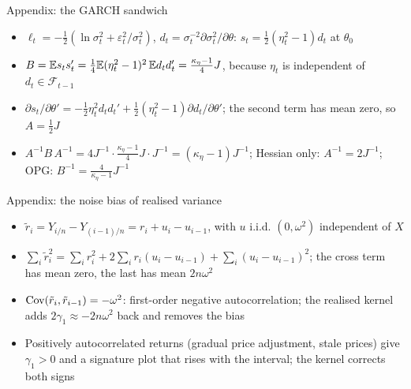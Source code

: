 \begin{frame}{Appendix: the GARCH sandwich}
\hypertarget{atsapp1}{}
\itemsize{\small}
\begin{itemize}
    \item $\ell_t = -\frac12(\ln\sigma^2_t + \varepsilon^2_t/\sigma^2_t)$, $d_t = \sigma_t^{-2}\partial\sigma^2_t/\partial\theta$: $s_t = \frac12(\eta^2_t - 1)d_t$ at $\theta_0$
    \item $B = \mathbb{E} s_ts_t' = \frac14\mathbb{E}(\eta^2_t - 1)^2\,\mathbb{E} d_td_t' = \frac{\kappa_\eta - 1}{4}J$, because $\eta_t$ is independent of $d_t \in \mathcal F_{t-1}$
    \item $\partial s_t/\partial\theta' = -\frac12\eta^2_td_td_t' + \frac12(\eta^2_t - 1)\partial d_t/\partial\theta'$; the second term has mean zero, so $A = \frac12J$
    \item $A^{-1}B\,A^{-1} = 4J^{-1}\cdot\frac{\kappa_\eta - 1}{4}J\cdot J^{-1} = (\kappa_\eta - 1)J^{-1}$; Hessian only: $A^{-1} = 2J^{-1}$; OPG: $B^{-1} = \frac{4}{\kappa_\eta - 1}J^{-1}$
\end{itemize}
\end{frame}

\begin{frame}{Appendix: the noise bias of realised variance}
\hypertarget{atsapp2}{}
\itemsize{\small}
\begin{itemize}
    \item $\tilde r_i = Y_{i/n} - Y_{(i-1)/n} = r_i + u_i - u_{i-1}$, with $u$ i.i.d. $(0, \omega^2)$ independent of $X$
    \item $\sum_i\tilde r_i^2 = \sum_ir_i^2 + 2\sum_ir_i(u_i - u_{i-1}) + \sum_i(u_i - u_{i-1})^2$; the cross term has mean zero, the last has mean $2n\omega^2$
    \item $\text{Cov}(\tilde r_i, \tilde r_{i-1}) = -\omega^2$: first-order negative autocorrelation; the realised kernel adds $2\gamma_1 \approx -2n\omega^2$ back and removes the bias
    \item Positively autocorrelated returns (gradual price adjustment, stale prices) give $\gamma_1 > 0$ and a signature plot that rises with the interval; the kernel corrects both signs
\end{itemize}
\end{frame}


